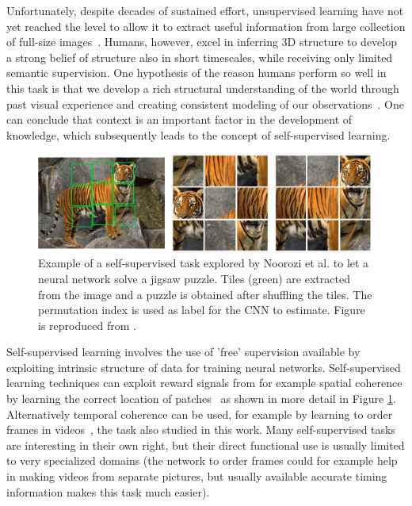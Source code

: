 Unfortunately, despite decades of sustained effort, unsupervised learning have not yet reached the level to allow it to extract useful information from large collection of full-size images~\cite{doersch2015}. Humans, however, excel in inferring 3D structure to develop a strong belief of structure also in short timescales, while receiving only limited semantic supervision. One hypothesis of the reason humans perform so well in this task is that we develop a rich structural understanding of the world through past visual experience and creating consistent modeling of our observations~\cite{zhou2017}. One can conclude that context is an important factor in the development of knowledge, which subsequently leads to the concept of self-supervised learning.

\begin{figure}[t]
\centering
\includegraphics[width=\textwidth]{images/jigsaw_puzzle.png}
\caption{Example of a self-supervised task explored by Noorozi et al.\cite{noroozi2016} to let a neural network solve a jigsaw puzzle. Tiles (green) are extracted from the image and a puzzle is obtained after shuffling the tiles. The permutation index is used as label for the CNN to estimate. Figure is reproduced from \cite{noroozi2016}.}
\label{fig:jigsaw}
\end{figure}

Self-supervised learning involves the use of 'free' supervision available by exploiting intrinsic structure of data for training neural networks. Self-supervised learning techniques can exploit reward signals from for example spatial coherence by learning the correct location of patches~\cite{doersch2015, noroozi2016} as shown in more detail in Figure \ref{fig:jigsaw}. Alternatively temporal coherence can be used, for example by learning to order frames in videos~\cite{misra2016, lee2017}, the task also studied in this work. Many self-supervised tasks are interesting in their own right, but their direct functional use is usually limited to very specialized domains (the network to order frames could for example help in making videos from separate pictures, but usually available accurate timing information makes this task much easier).

